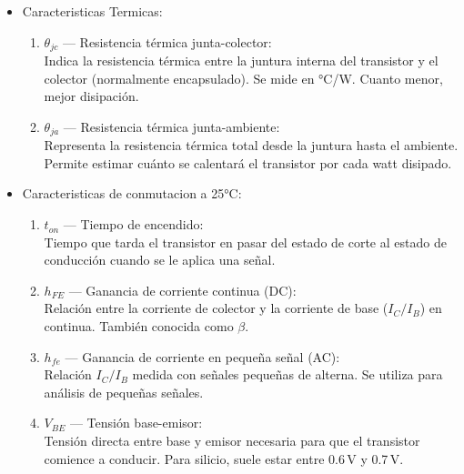 \begin{itemize}
            \item Caracteristicas Termicas:
            
                \begin{enumerate}
                    \item \textbf{$\theta_{jc}$} — Resistencia térmica junta-colector: \\
                    Indica la resistencia térmica entre la juntura interna del transistor y el colector (normalmente encapsulado). Se mide en °C/W. Cuanto menor, mejor disipación.
                
                    \item \textbf{$\theta_{ja}$} — Resistencia térmica junta-ambiente: \\
                    Representa la resistencia térmica total desde la juntura hasta el ambiente. Permite estimar cuánto se calentará el transistor por cada watt disipado.
                \end{enumerate}
                
            \item Caracteristicas de conmutacion a 25°C:
            
                \begin{enumerate}
                \item \textbf{$t_{on}$} — Tiempo de encendido: \\
                Tiempo que tarda el transistor en pasar del estado de corte al estado de conducción cuando se le aplica una señal.
            
                \item \textbf{$h_{FE}$} — Ganancia de corriente continua (DC): \\
                Relación entre la corriente de colector y la corriente de base ($I_C / I_B$) en continua. También conocida como $\beta$.
            
                \item \textbf{$h_{fe}$} — Ganancia de corriente en pequeña señal (AC): \\
                Relación $I_C / I_B$ medida con señales pequeñas de alterna. Se utiliza para análisis de pequeñas señales.
            
                \item \textbf{$V_{BE}$} — Tensión base-emisor: \\
                Tensión directa entre base y emisor necesaria para que el transistor comience a conducir. Para silicio, suele estar entre 0.6\,V y 0.7\,V.
            

\end{enumerate}
\end{itemize}
